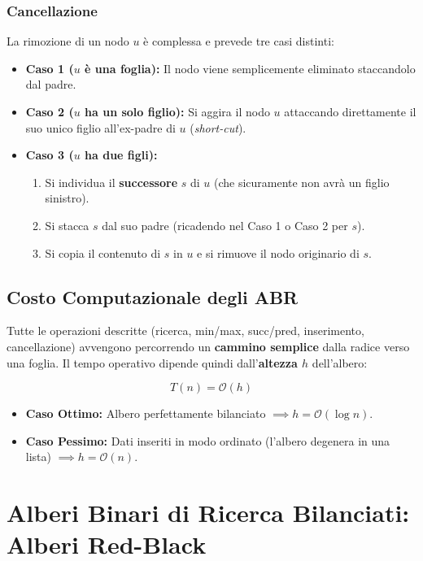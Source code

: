 \documentclass[12pt, a4paper]{article}
\begin{document}
\subsubsection{Cancellazione}
La rimozione di un nodo $u$ è complessa e prevede tre casi distinti:
\begin{itemize}
\item \textbf{Caso 1 ($u$ è una foglia):} Il nodo viene semplicemente eliminato staccandolo dal padre.
\item \textbf{Caso 2 ($u$ ha un solo figlio):} Si aggira il nodo $u$ attaccando direttamente il suo unico figlio all'ex-padre di $u$ (\textit{short-cut}).
\item \textbf{Caso 3 ($u$ ha due figli):}
\begin{enumerate}
\item Si individua il \textbf{successore} $s$ di $u$ (che sicuramente non avrà un figlio sinistro).
\item Si stacca $s$ dal suo padre (ricadendo nel Caso 1 o Caso 2 per $s$).
\item Si copia il contenuto di $s$ in $u$ e si rimuove il nodo originario di $s$.
\end{enumerate}
\end{itemize}

\subsection{Costo Computazionale degli ABR}
Tutte le operazioni descritte (ricerca, min/max, succ/pred, inserimento, cancellazione) avvengono percorrendo un \textbf{cammino semplice} dalla radice verso una foglia.
Il tempo operativo dipende quindi dall'\textbf{altezza $h$} dell'albero:


$$T(n) = \mathcal{O}(h)$$


\begin{itemize}
\item \textbf{Caso Ottimo:} Albero perfettamente bilanciato $\implies h = \mathcal{O}(\log n)$.
\item \textbf{Caso Pessimo:} Dati inseriti in modo ordinato (l'albero degenera in una lista) $\implies h = \mathcal{O}(n)$.
\end{itemize}

\newpage

\section{Alberi Binari di Ricerca Bilanciati: Alberi Red-Black}
\end{document}
